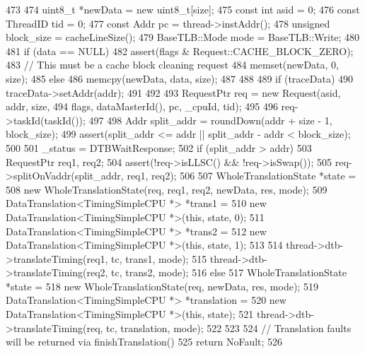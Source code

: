 \begin{DoxyCode}
473 {
474     uint8_t *newData = new uint8_t[size];
475     const int asid = 0;
476     const ThreadID tid = 0;
477     const Addr pc = thread->instAddr();
478     unsigned block_size = cacheLineSize();
479     BaseTLB::Mode mode = BaseTLB::Write;
480 
481     if (data == NULL) {
482         assert(flags & Request::CACHE_BLOCK_ZERO);
483         // This must be a cache block cleaning request
484         memset(newData, 0, size);
485     } else {
486         memcpy(newData, data, size);
487     }
488 
489     if (traceData) {
490         traceData->setAddr(addr);
491     }
492 
493     RequestPtr req = new Request(asid, addr, size,
494                                  flags, dataMasterId(), pc, _cpuId, tid);
495 
496     req->taskId(taskId());
497 
498     Addr split_addr = roundDown(addr + size - 1, block_size);
499     assert(split_addr <= addr || split_addr - addr < block_size);
500 
501     _status = DTBWaitResponse;
502     if (split_addr > addr) {
503         RequestPtr req1, req2;
504         assert(!req->isLLSC() && !req->isSwap());
505         req->splitOnVaddr(split_addr, req1, req2);
506 
507         WholeTranslationState *state =
508             new WholeTranslationState(req, req1, req2, newData, res, mode);
509         DataTranslation<TimingSimpleCPU *> *trans1 =
510             new DataTranslation<TimingSimpleCPU *>(this, state, 0);
511         DataTranslation<TimingSimpleCPU *> *trans2 =
512             new DataTranslation<TimingSimpleCPU *>(this, state, 1);
513 
514         thread->dtb->translateTiming(req1, tc, trans1, mode);
515         thread->dtb->translateTiming(req2, tc, trans2, mode);
516     } else {
517         WholeTranslationState *state =
518             new WholeTranslationState(req, newData, res, mode);
519         DataTranslation<TimingSimpleCPU *> *translation =
520             new DataTranslation<TimingSimpleCPU *>(this, state);
521         thread->dtb->translateTiming(req, tc, translation, mode);
522     }
523 
524     // Translation faults will be returned via finishTranslation()
525     return NoFault;
526 }
\end{DoxyCode}


